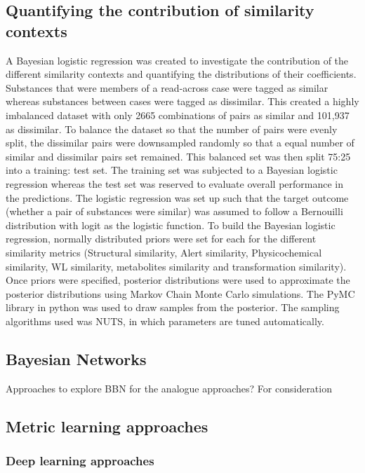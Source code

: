 \documentclass[
  super,
  preprint,
  3p]{elsarticle}
\begin{document}
\subsection{Quantifying the contribution of similarity
contexts}\label{quantifying-the-contribution-of-similarity-contexts}

A Bayesian logistic regression was created to investigate the
contribution of the different similarity contexts and quantifying the
distributions of their coefficients. Substances that were members of a
read-across case were tagged as similar whereas substances between cases
were tagged as dissimilar. This created a highly imbalanced dataset with
only 2665 combinations of pairs as similar and 101,937 as dissimilar. To
balance the dataset so that the number of pairs were evenly split, the
dissimilar pairs were downsampled randomly so that a equal number of
similar and dissimilar pairs set remained. This balanced set was then
split 75:25 into a training: test set. The training set was subjected to
a Bayesian logistic regression whereas the test set was reserved to
evaluate overall performance in the predictions. The logistic regression
was set up such that the target outcome (whether a pair of substances
were similar) was assumed to follow a Bernouilli distribution with logit
as the logistic function. To build the Bayesian logistic regression,
normally distributed priors were set for each for the different
similarity metrics (Structural similarity, Alert similarity,
Physicochemical similarity, WL similarity, metabolites similarity and
transformation similarity). Once priors were specified, posterior
distributions were used to approximate the posterior distributions using
Markov Chain Monte Carlo simulations. The PyMC library in python was
used to draw samples from the posterior. The sampling algorithms used
was NUTS, in which parameters are tuned automatically.

\subsection{Bayesian Networks}\label{bayesian-networks}

Approaches to explore BBN for the analogue approaches? For consideration

\subsection{Metric learning
approaches}\label{metric-learning-approaches}

\subsubsection{Deep learning approaches}\label{deep-learning-approaches}
\end{document}
